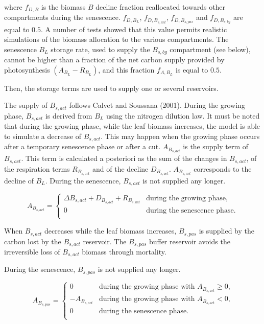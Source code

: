 {where $f_{D,B}$ is the biomass $B$ decline fraction 
reallocated towards other compartments during the senescence.
$f_{D,B_L}$, 
$f_{D,B_{s,act}}$, $f_{D,B_{s,pas}}$ and $f_{D,B_{s,bg}}$ are equal to 
$0.5$. A number of tests showed that this value permits realistic simulations 
of the biomass allocation to the various compartments.
The senescence $B_L$ storage rate, used to supply the 
$B_{s,bg}$ compartment (see below), cannot be higher than a 
fraction of the net carbon supply provided by photosynthesis 
$(A_{B_L}-R_{B_L})$, and this fraction $f_{A,B_L}$ is equal to $0.5$.


Then, the storage terms are used to supply one or several reservoirs.

The supply of $B_{s,act}$ follows Calvet and Soussana (2001). 
During the growing phase, $B_{s,act}$ is derived from $B_L$ 
using the nitrogen dilution law. 
It must be noted that during the growing phase, while the leaf biomass increases, 
the model is able to simulate a decrease of $B_{s,act}$. This may happen 
when the growing phase occurs after a temporary senescence phase or after a cut. 
$A_{B_{s,act}}$ is the supply term of $B_{s,act}$. This term is calculated 
a posteriori as the sum of the changes in  
$B_{s,act}$, of the respiration terms $R_{B_{s,act}}$ and of the decline 
$D_{B_{s,act}}$. $A_{B_{s,act}}$ corresponds to the decline of $B_L$.
During the senescence, $B_{s,act}$ is not supplied any longer.

\begin{equation}
A_{B_{s,act}} =    \left\{ 
  \begin{array}{ll}
    \Delta B_{s,act} + D_{B_{s,act}} + R_{B_{s,act}} &  \mbox{during the growing phase,} \\
    0                                                &  \mbox{during the senescence phase.} \\
  \end{array}
                  \right.
\label{eqalimbsact}
\end{equation}


When $B_{s,act}$ decreases while the leaf biomass increases, $B_{s,pas}$ is supplied 
by the carbon lost by the $B_{s,act}$ reservoir. The $B_{s,pas}$ buffer reservoir avoids 
the irreversible loss of $B_{s,act}$ biomass through mortality. 

During the senescence, $B_{s,pas}$ is not supplied any longer.

\begin{equation}
A_{B_{s,pas}} =    \left\{ 
  \begin{array}{ll}
    0               & \mbox{during the growing phase with $A_{B_{s,act}} \ge 0$,} \\
    - A_{B_{s,act}} & \mbox{during the growing phase with $A_{B_{s,act}} <   0$,} \\
    0               & \mbox{during the senescence phase.} \\
  \end{array}
                     \right.
\end{equation}


}
